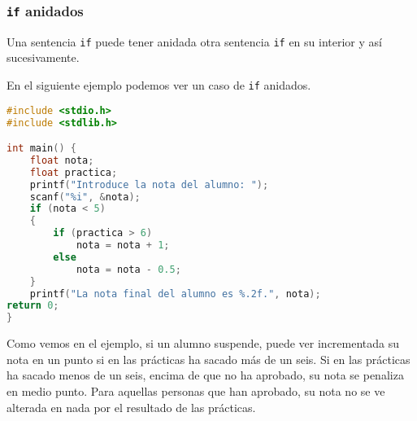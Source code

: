 \subsubsection{\texttt{if} anidados}{
Una sentencia \texttt{if} puede tener anidada otra sentencia \texttt{if} en su interior y así sucesivamente.

En el siguiente ejemplo podemos ver un caso de \texttt{if} anidados.
\begin{Ejemplo}
\begin{lstlisting}[language=C]
#include <stdio.h>
#include <stdlib.h>

int main() {
    float nota;
    float practica;
    printf("Introduce la nota del alumno: ");
    scanf("%i", &nota);
    if (nota < 5)
    {
        if (practica > 6)
            nota = nota + 1;
        else
            nota = nota - 0.5;
    }
    printf("La nota final del alumno es %.2f.", nota);
return 0;
}
\end{lstlisting}
\Explicacion
Como vemos en el ejemplo, si un alumno suspende, puede ver incrementada su nota en un punto si en las prácticas ha sacado más de un seis. Si en las prácticas ha sacado menos de un seis, encima de que no ha aprobado, su nota se penaliza en medio punto. Para aquellas personas que han aprobado, su nota no se ve alterada en nada por el resultado de las prácticas.
\end{Ejemplo}
}
